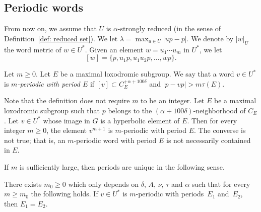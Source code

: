\subsection{Periodic words}
From now on, we assume that $U$ is $\alpha$-strongly reduced (in the sense of Definition~\ref{def: reduced set}).
We let $\lambda = \max_{u\in U}|up-p|$.
We denote by $|w|_U$ the word metric of $w\in U^*$.
Given an element $w = u_1 \cdots u_m$ in $U^*$, we let
\[
[w]=\{p, u_1p,u_1u_2p,\ldots, wp\}.
\]

\begin{df}\label{D: periodic}
Let $m \geq 0$.
Let $E$ be a maximal loxodromic subgroup.
We say that a word $v\in U^*$ is \emph{$m$-periodic with period $E$} if $[v]\subset C_{E}^{+\alpha + 100\delta}$ and $|p-vp| > m \tau(E).$
\end{df}

\begin{rem}
Note that the definition does not require $m$ to be an integer.
Let $E$ be a maximal loxodromic subgroup such that $p$ belongs to the $(\alpha + 100\delta)$-neighborhood of $C_E$.
Let $v \in U^*$ whose image in $G$ is a hyperbolic element of $E$.
Then for every integer $m\geq0$,
the element $v^{m+1}$ is $m$-periodic with period $E$.
The converse is not true; that is, an $m$-periodic word with period $E$ is not necessarily contained in $E$.
\end{rem}

If $m$ is sufficiently large, then periods are unique in the following sense.

\begin{prop}
\label{res: unicity period}
There exists $m_0 \geq 0$ which only depends on $\delta$, $A$, $\nu$, $\tau$ and $\alpha$ such that for every $m \geq m_0$ the following holds.
If $v \in U^*$ is $m$-periodic with periods~$E_1$ and~$E_2$, then $E_1=E_2$.
\end{prop}

